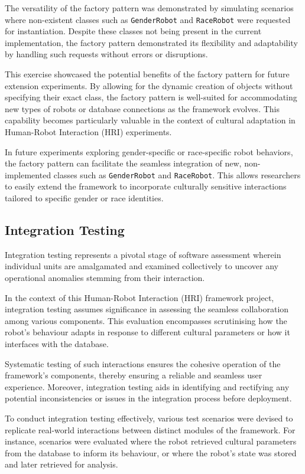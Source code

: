 The versatility of the factory pattern was demonstrated by simulating scenarios where non-existent classes such as \texttt{GenderRobot} and \texttt{RaceRobot} were requested for instantiation. Despite these classes not being present in the current implementation, the factory pattern demonstrated its flexibility and adaptability by handling such requests without errors or disruptions.

This exercise showcased the potential benefits of the factory pattern for future extension experiments. By allowing for the dynamic creation of objects without specifying their exact class, the factory pattern is well-suited for accommodating new types of robots or database connections as the framework evolves. This capability becomes particularly valuable in the context of cultural adaptation in Human-Robot Interaction (HRI) experiments.

In future experiments exploring gender-specific or race-specific robot behaviors, the factory pattern can facilitate the seamless integration of new, non-implemented classes such as \texttt{GenderRobot} and \texttt{RaceRobot}. This allows researchers to easily extend the framework to incorporate culturally sensitive interactions tailored to specific gender or race identities.

\subsection{Integration Testing}

Integration testing represents a pivotal stage of software assessment wherein individual units are amalgamated and examined collectively to uncover any operational anomalies stemming from their interaction.

In the context of this Human-Robot Interaction (HRI) framework project, integration testing assumes significance in assessing the seamless collaboration among various components. This evaluation encompasses scrutinising how the robot's behaviour adapts in response to different cultural parameters or how it interfaces with the database.

Systematic testing of such interactions ensures the cohesive operation of the framework's components, thereby ensuring a reliable and seamless user experience. Moreover, integration testing aids in identifying and rectifying any potential inconsistencies or issues in the integration process before deployment.

To conduct integration testing effectively, various test scenarios were devised to replicate real-world interactions between distinct modules of the framework. For instance, scenarios were evaluated where the robot retrieved cultural parameters from the database to inform its behaviour, or where the robot's state was stored and later retrieved for analysis.